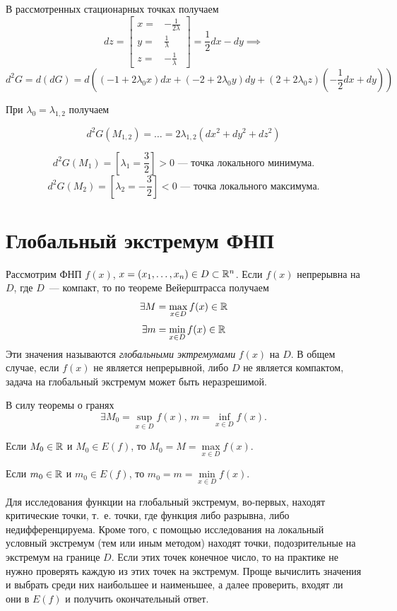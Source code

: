 \documentclass[../../main.tex]{subfiles}
\begin{document}
\begin{exmp}
	В рассмотренных стационарных точках получаем
	\[ dz = \left[
	\begin{array}{rl}
	x =& -\frac{1}{2\lambda} \\
	y =& \frac{1}{\lambda} \\
	z =& -\frac{1}{\lambda}
	\end{array}
	\right] = \frac{1}{2}dx - dy \implies\] 
	\[d^2G = d\left(dG\right) = 
	d\left(\left(-1 + 2\lambda_0x\right)dx + \left(-2 
	+ 2\lambda_0y\right)dy 
	+ \left(2 + 2\lambda_0z\right)\left(-\frac{1}{2}dx + dy\right)\right) \]
	
	При $\lambda_0 = \lambda_{1, 2}$ получаем
	
	\[d^2G(M_{1, 2}) = \dots = 2\lambda_{1, 2}(dx^2 + dy^2 + dz^2)\]
	
	\[d^2G(M_1) = \left[\lambda_1 = \frac{3}{2}\right] > 0
	\text{~--- точка локального минимума.}\]
	\[d^2G(M_2) = \left[\lambda_2 = -\frac{3}{2}\right] < 0
	\text{~--- точка локального максимума.}\]
	\end{exmp}
	
	\section{Глобальный экстремум ФНП}
	
	Рассмотрим ФНП $f(x)$, $x = (x_1, \dots, 
	x_n) \in D \subset \mathbb{R}^n$. Если $f(x)$ непрерывна на $D$,
	где $D$~--- компакт, то по теореме Вейерштрасса получаем
	\[ \exists M = \max\limits_{x \in D} f(x) \in \mathbb{R} \] 
	\[ \exists m = \min\limits_{x \in D} f(x) \in \mathbb{R} \]
	Эти значения называются \emph{глобальными эктремумами} $f(x)$ на $D$.
	В общем случае, если $f(x)$ не является непрерывной, либо $D$ 
	не является компактом, задача на глобальный экстремум может быть неразрешимой.
	
	В силу теоремы о гранях
	\[ \exists M_0 = \sup\limits_{x \in D} f(x),\
	m = \inf\limits_{x \in D} f(x). \]
	
	Если $M_0 \in \mathbb{R}$ и $M_0 \in E(f)$, то $M_0 = M = 
	\max\limits_{x \in D} f(x)$.
	
	Если $m_0 \in \mathbb{R}$ и $m_0 \in E(f)$, то $m_0 = m = 
	\min\limits_{x \in D} f(x)$.
	
	Для исследования функции на глобальный экстремум, во-первых, 
	находят критические точки, т.~е. точки, 
	где функция либо разрывна, либо недифференцируема. Кроме того, с помощью 
	исследования на локальный условный экстремум (тем или иным методом)
	находят точки, подозрительные на экстремум на границе $D$.
	Если этих точек конечное число, то на практике не нужно проверять каждую из 
	этих точек на экстремум.
	Проще вычислить значения и выбрать среди них наибольшее и наименьшее, 
	а далее проверить, входят ли они в $E(f)$ и 
	получить окончательный ответ.
	
\end{document}
